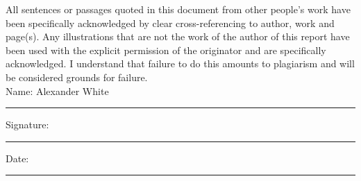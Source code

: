 \documentclass[11pt,oneside]{book}
\begin{document}
All sentences or passages quoted in this document from other people's work have been specifically acknowledged by clear cross-referencing to author, work and page(s).  Any illustrations that are not the work of the author of this report have been used with the explicit permission of the originator and are specifically acknowledged.  I understand that failure to do this amounts to plagiarism and will be considered grounds for failure.\\[1cm]

\noindent Name: Alexander White\\[1mm]
\rule[1em]{25em}{0.5pt}

\noindent Signature:\\[1mm]
\rule[1em]{25em}{0.5pt}

\noindent Date:\\[1mm]
\rule[1em]{25em}{0.5pt}







\tableofcontents
\listoffigures
\listoftables



\mainmatter










 
 



\begin{appendices}


\end{appendices}
\end{document}
